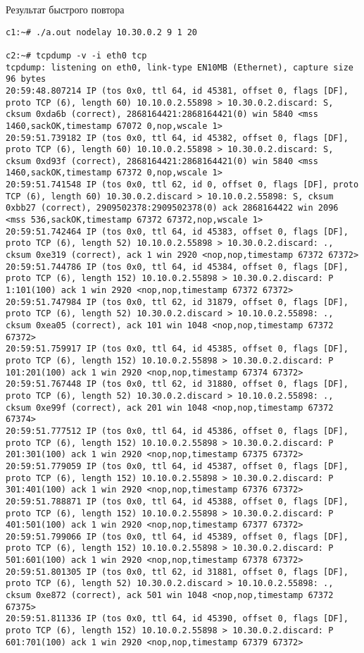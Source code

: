 \documentclass[a4paper,12pt]{article}
\begin{document}
Результат быстрого повтора
\begin{lstlisting}
c1:~# ./a.out nodelay 10.30.0.2 9 1 20

c2:~# tcpdump -v -i eth0 tcp
tcpdump: listening on eth0, link-type EN10MB (Ethernet), capture size 96 bytes
20:59:48.807214 IP (tos 0x0, ttl 64, id 45381, offset 0, flags [DF], proto TCP (6), length 60) 10.10.0.2.55898 > 10.30.0.2.discard: S, cksum 0xda6b (correct), 2868164421:2868164421(0) win 5840 <mss 1460,sackOK,timestamp 67072 0,nop,wscale 1>
20:59:51.739182 IP (tos 0x0, ttl 64, id 45382, offset 0, flags [DF], proto TCP (6), length 60) 10.10.0.2.55898 > 10.30.0.2.discard: S, cksum 0xd93f (correct), 2868164421:2868164421(0) win 5840 <mss 1460,sackOK,timestamp 67372 0,nop,wscale 1>
20:59:51.741548 IP (tos 0x0, ttl 62, id 0, offset 0, flags [DF], proto TCP (6), length 60) 10.30.0.2.discard > 10.10.0.2.55898: S, cksum 0xbb27 (correct), 2909502378:2909502378(0) ack 2868164422 win 2096 <mss 536,sackOK,timestamp 67372 67372,nop,wscale 1>
20:59:51.742464 IP (tos 0x0, ttl 64, id 45383, offset 0, flags [DF], proto TCP (6), length 52) 10.10.0.2.55898 > 10.30.0.2.discard: ., cksum 0xe319 (correct), ack 1 win 2920 <nop,nop,timestamp 67372 67372>
20:59:51.744786 IP (tos 0x0, ttl 64, id 45384, offset 0, flags [DF], proto TCP (6), length 152) 10.10.0.2.55898 > 10.30.0.2.discard: P 1:101(100) ack 1 win 2920 <nop,nop,timestamp 67372 67372>
20:59:51.747984 IP (tos 0x0, ttl 62, id 31879, offset 0, flags [DF], proto TCP (6), length 52) 10.30.0.2.discard > 10.10.0.2.55898: ., cksum 0xea05 (correct), ack 101 win 1048 <nop,nop,timestamp 67372 67372>
20:59:51.759917 IP (tos 0x0, ttl 64, id 45385, offset 0, flags [DF], proto TCP (6), length 152) 10.10.0.2.55898 > 10.30.0.2.discard: P 101:201(100) ack 1 win 2920 <nop,nop,timestamp 67374 67372>
20:59:51.767448 IP (tos 0x0, ttl 62, id 31880, offset 0, flags [DF], proto TCP (6), length 52) 10.30.0.2.discard > 10.10.0.2.55898: ., cksum 0xe99f (correct), ack 201 win 1048 <nop,nop,timestamp 67372 67374>
20:59:51.777512 IP (tos 0x0, ttl 64, id 45386, offset 0, flags [DF], proto TCP (6), length 152) 10.10.0.2.55898 > 10.30.0.2.discard: P 201:301(100) ack 1 win 2920 <nop,nop,timestamp 67375 67372>
20:59:51.779059 IP (tos 0x0, ttl 64, id 45387, offset 0, flags [DF], proto TCP (6), length 152) 10.10.0.2.55898 > 10.30.0.2.discard: P 301:401(100) ack 1 win 2920 <nop,nop,timestamp 67376 67372>
20:59:51.788871 IP (tos 0x0, ttl 64, id 45388, offset 0, flags [DF], proto TCP (6), length 152) 10.10.0.2.55898 > 10.30.0.2.discard: P 401:501(100) ack 1 win 2920 <nop,nop,timestamp 67377 67372>
20:59:51.799066 IP (tos 0x0, ttl 64, id 45389, offset 0, flags [DF], proto TCP (6), length 152) 10.10.0.2.55898 > 10.30.0.2.discard: P 501:601(100) ack 1 win 2920 <nop,nop,timestamp 67378 67372>
20:59:51.801305 IP (tos 0x0, ttl 62, id 31881, offset 0, flags [DF], proto TCP (6), length 52) 10.30.0.2.discard > 10.10.0.2.55898: ., cksum 0xe872 (correct), ack 501 win 1048 <nop,nop,timestamp 67372 67375>
20:59:51.811336 IP (tos 0x0, ttl 64, id 45390, offset 0, flags [DF], proto TCP (6), length 152) 10.10.0.2.55898 > 10.30.0.2.discard: P 601:701(100) ack 1 win 2920 <nop,nop,timestamp 67379 67372>


\end{lstlisting}
\end{document}
